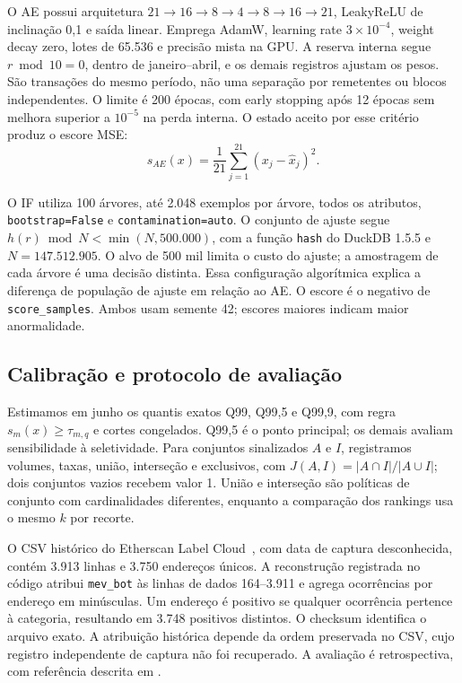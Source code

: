 
O AE possui arquitetura $21\!\to\!16\!\to\!8\!\to\!4\!\to\!8\!\to\!16\!\to\!21$, LeakyReLU de inclinação 0,1 e saída linear. Emprega AdamW, learning rate $3\times10^{-4}$, weight decay zero, lotes de 65.536 e precisão mista na GPU. A reserva interna segue $r\bmod10=0$, dentro de janeiro--abril, e os demais registros ajustam os pesos. São transações do mesmo período, não uma separação por remetentes ou blocos independentes. O limite é 200 épocas, com early stopping após 12 épocas sem melhora superior a $10^{-5}$ na perda interna. O estado aceito por esse critério produz o escore MSE:
\begin{equation}
s_{AE}(x)=\frac{1}{21}\sum_{j=1}^{21}(x_j-\widehat{x}_j)^2.
\end{equation}

O IF utiliza 100 árvores, até 2.048 exemplos por árvore, todos os atributos, \texttt{bootstrap=False} e \texttt{contamination=auto}. O conjunto de ajuste segue $h(r)\bmod N<\min(N,500.000)$, com a função \texttt{hash} do DuckDB 1.5.5 e $N=147.512.905$. O alvo de 500 mil limita o custo do ajuste; a amostragem de cada árvore é uma decisão distinta. Essa configuração algorítmica explica a diferença de população de ajuste em relação ao AE. O escore é o negativo de \texttt{score\_samples}. Ambos usam semente 42; escores maiores indicam maior anormalidade.

\subsection{Calibração e protocolo de avaliação}
Estimamos em junho os quantis exatos Q99, Q99,5 e Q99,9, com regra $s_m(x)\geq\tau_{m,q}$ e cortes congelados. Q99,5 é o ponto principal; os demais avaliam sensibilidade à seletividade. Para conjuntos sinalizados $A$ e $I$, registramos volumes, taxas, união, interseção e exclusivos, com $J(A,I)=|A\cap I|/|A\cup I|$; dois conjuntos vazios recebem valor 1. União e interseção são políticas de conjunto com cardinalidades diferentes, enquanto a comparação dos rankings usa o mesmo $k$ por recorte.

O CSV histórico do Etherscan Label Cloud~\cite{EtherscanLabels}, com data de captura desconhecida, contém 3.913 linhas e 3.750 endereços únicos. A reconstrução registrada no código atribui \texttt{mev\_bot} às linhas de dados 164--3.911 e agrega ocorrências por endereço em minúsculas. Um endereço é positivo se qualquer ocorrência pertence à categoria, resultando em 3.748 positivos distintos. O checksum identifica o arquivo exato. A atribuição histórica depende da ordem preservada no CSV, cujo registro independente de captura não foi recuperado. A avaliação é retrospectiva, com referência descrita em .

